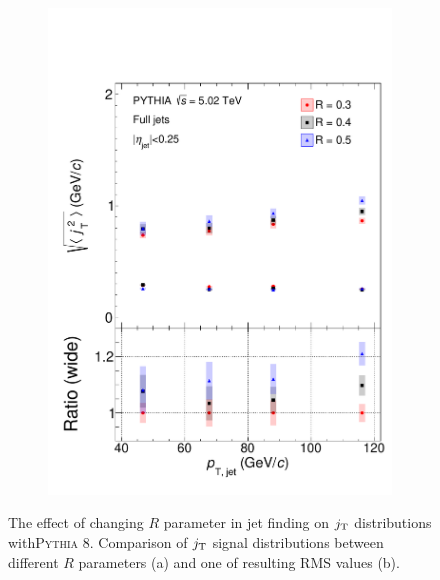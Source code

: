 \begin{figure}[hbt!]
\begin{subfigure}{0.48\textwidth}
  \includegraphics[width=\linewidth]{newfigures/RcomparisonRMS.pdf}
  \caption{}
\end{subfigure}

  \caption{The effect of changing $R$ parameter in jet finding on $j_{\rm T}$ distributions with\textsc{Pythia} 8. Comparison of $j_{\rm T}$ signal distributions between different $R$ parameters (a) and one of resulting RMS values (b).}
  \label{fig:Rcomparison}
  \end{figure}
  
  
